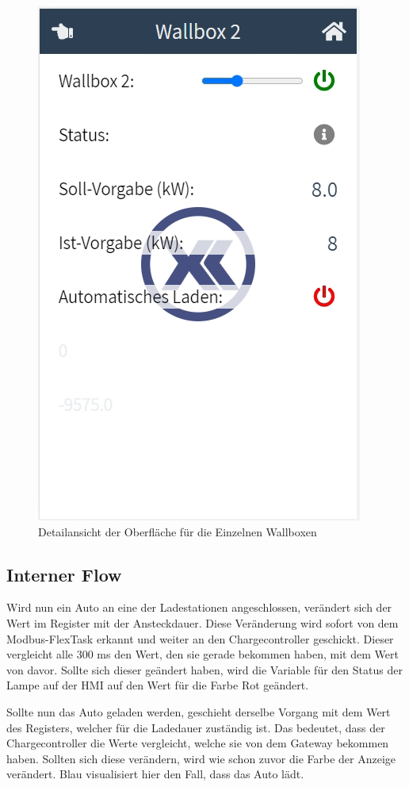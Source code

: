 \begin{figure}[h t]
  \centering
  \includegraphics[scale=0.5]{pics/DetailansichtWallbox2.png}
  \caption{Detailansicht der Oberfläche für die Einzelnen Wallboxen }
  \label{fig:impl:HMIWallboxDetail}
\end{figure}


\subsection{Interner Flow}

Wird nun ein Auto an eine der Ladestationen angeschlossen, verändert sich der Wert im Register mit der Ansteckdauer. Diese Veränderung wird sofort von dem Modbus-FlexTask erkannt und weiter an den Chargecontroller geschickt. Dieser vergleicht alle 300 ms den Wert, den sie gerade bekommen haben, mit dem Wert von davor. Sollte sich dieser geändert haben, wird die Variable für den Status der Lampe auf der HMI auf den Wert für die Farbe Rot geändert. 

Sollte nun das Auto geladen werden, geschieht derselbe Vorgang mit dem Wert des Registers, welcher für die Ladedauer zuständig ist. Das bedeutet, dass der Chargecontroller die Werte vergleicht, welche sie von dem Gateway bekommen haben. Sollten sich diese verändern, wird wie schon zuvor die Farbe der Anzeige verändert. Blau visualisiert hier den Fall, dass das Auto lädt. 


